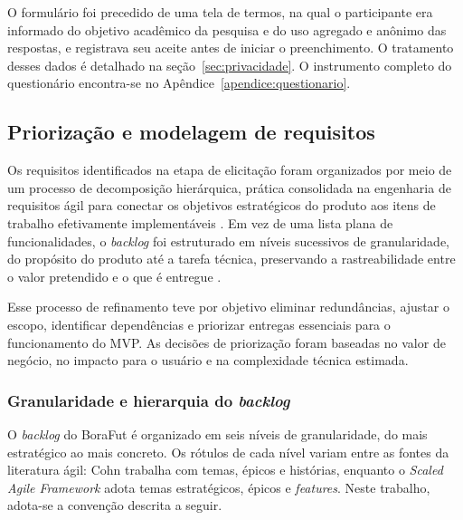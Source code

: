         O formulário foi precedido de uma tela de termos, na qual o participante era informado do objetivo acadêmico da pesquisa e do uso agregado e anônimo das respostas, e registrava seu aceite antes de iniciar o preenchimento. O tratamento desses dados é detalhado na seção~\ref{sec:privacidade}. O instrumento completo do questionário encontra-se no Apêndice~\ref{apendice:questionario}.

    \subsection{Priorização e modelagem de requisitos}
        \label{sec:priorizacao}
        
        Os requisitos identificados na etapa de elicitação foram organizados por meio de um processo de decomposição hierárquica, prática consolidada na engenharia de requisitos ágil para conectar os objetivos estratégicos do produto aos itens de trabalho efetivamente implementáveis \cite{cohn2004, sommerville2011}. Em vez de uma lista plana de funcionalidades, o \textit{backlog} foi estruturado em níveis sucessivos de granularidade, do propósito do produto até a tarefa técnica, preservando a rastreabilidade entre o valor pretendido e o que é entregue \cite{wiegers2013}.

        Esse processo de refinamento teve por objetivo eliminar redundâncias, ajustar o escopo, identificar dependências e priorizar entregas essenciais para o funcionamento do MVP. As decisões de priorização foram baseadas no valor de negócio, no impacto para o usuário e na complexidade técnica estimada.

        \subsubsection{Granularidade e hierarquia do \textit{backlog}}

            O \textit{backlog} do BoraFut é organizado em seis níveis de granularidade, do mais estratégico ao mais concreto. Os rótulos de cada nível variam entre as fontes da literatura ágil: Cohn \cite{cohn2004} trabalha com temas, épicos e histórias, enquanto o \textit{Scaled Agile Framework} \cite{safe2023} adota temas estratégicos, épicos e \textit{features}. Neste trabalho, adota-se a convenção descrita a seguir.

